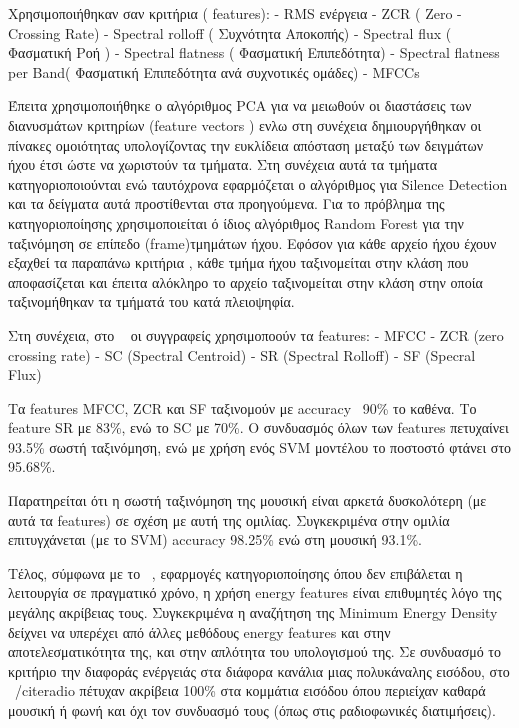  Χρησιμοποιήθηκαν σαν κριτήρια ( features):
- RMS ενέργεια
- ZCR ( Zero - Crossing Rate)
- Spectral rolloff ( Συχνότητα Αποκοπής)
- Spectral flux ( Φασματική Ροή )
- Spectral flatness ( Φασματική Επιπεδότητα)
- Spectral flatness per Band( Φασματική Επιπεδότητα ανά συχνοτικές ομάδες)
- MFCCs

Έπειτα χρησιμοποιήθηκε ο αλγόριθμος PCA για να μειωθούν οι διαστάσεις των διανυσμάτων κριτηρίων (feature vectors ) ενλω στη συνέχεια δημιουργήθηκαν οι πίνακες ομοιότητας υπολογίζοντας την ευκλίδεια απόσταση μεταξύ των δειγμάτων ήχου έτσι ώστε να χωριστούν τα τμήματα. Στη συνέχεια αυτά τα τμήματα κατηγοριοποιούνται ενώ ταυτόχρονα εφαρμόζεται ο αλγόριθμος για Silence Detection και τα δείγματα αυτά προστίθενται στα προηγούμενα. Για το πρόβλημα της κατηγοριοποίησης χρησιμοποιείται ό ίδιος αλγόριθμος Random Forest για την ταξινόμηση σε επίπεδο (frame)τμημάτων ήχου. Εφόσον για κάθε αρχείο ήχου έχουν εξαχθεί τα παραπάνω κριτήρια , κάθε τμήμα ήχου ταξινομείται στην κλάση που αποφασίζεται και έπειτα αλόκληρο το αρχείο ταξινομείται στην κλάση στην οποία ταξινομήθηκαν τα τμήματά του κατά πλειοψηφία.


Στη συνέχεια, στο ~\cite{hybrid} οι συγγραφείς χρησιμοποούν τα features:
- ΜFCC
- ZCR (zero crossing rate)
- SC (Spectral Centroid)
- SR (Spectral Rolloff)
- SF (Specral Flux)

Τα features ΜFCC, ZCR και SF ταξινομούν με accuracy ~90\% το καθένα. Το feature SR με 83\%, ενώ το SC με 70\%.
Ο συνδυασμός όλων των features πετυχαίνει 93.5\% σωστή ταξινόμηση, ενώ με χρήση ενός SVM μοντέλου το ποστοστό φτάνει στο 95.68\%.

Παρατηρείται ότι η σωστή ταξινόμηση της μουσική είναι αρκετά δυσκολότερη (με αυτά τα features) σε σχέση με αυτή της ομιλίας. Συγκεκριμένα στην ομιλία επιτυγχάνεται (με το SVM) accuracy 98.25\% ενώ στη μουσική 93.1\%.

Τέλος, σύμφωνα με το  ~\cite{radio}, εφαρμογές κατηγοριοποίησης όπου δεν
επιβάλεται η λειτουργία σε πραγματικό χρόνο, η χρήση energy features είναι
επιθυμητές λόγο της μεγάλης ακρίβειας τους. Συγκεκριμένα η αναζήτηση της Minimum
Energy Density δείχνει να υπερέχει από άλλες μεθόδους energy features και στην
αποτελεσματικότητα της, και στην απλότητα του υπολογισμού της. Σε συνδυασμό το
κριτήριο την διαφοράς ενέργειάς στα διάφορα κανάλια μιας πολυκάναλης εισόδου,
στο ~/cite{radio} πέτυχαν ακρίβεια 100\% στα κομμάτια εισόδου όπου περιείχαν
καθαρά μουσική ή φωνή και όχι τον συνδυασμό τους (όπως στις ραδιοφωνικές
διατιμήσεις).
